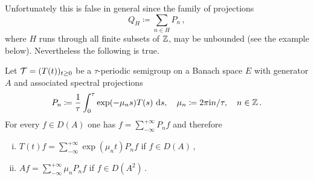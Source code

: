 Unfortunately this is false in general since the family of projections
\[
Q_{H} \coloneqq \sum_{n \in H} P_{n}\,,
\]
where $H$ runs through all finite subsets of $\mathbb{Z}$, may be unbounded (see the example below).
Nevertheless the following is true.
\begin{theorem}\label{thm:a3-5.4}
Let $\mathcal{T} = (T(t))_{t \geq 0}$ be a $\tau$-periodic semigroup on a Banach space $E$ with generator $A$ and associated spectral projections
\[
P_{n} \coloneqq  \frac{1}{\tau}\int_{0}^{\tau} \exp(-\mu_{n}s)T(s) \, \mathop{}\!\mathrm{d}{s}, \quad \mu_{n} \coloneqq 2\pi\mathrm{i} n/\tau, \quad n \in \mathbb{Z} \,.
\]
For every $f \in D(A)$ one has $f = \sum_{-\infty}^{+\infty} P_{n}f$ and therefore
\begin{enumerate}[(i)]
\item 
$T(t)f = \sum_{-\infty}^{+\infty} \exp(\mu_{n}t)P_{n}f$ \quad if $f \in D(A)$\,,

\item 
$Af = \sum_{-\infty}^{+\infty} \mu_{n}P_{n}f$ \quad if $f \in D(A^{2})$\,.
\end{enumerate}
\end{theorem}
